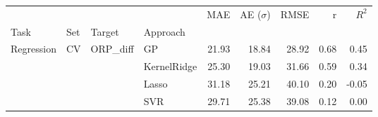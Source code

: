 \documentclass{standalone}
\begin{document}
\begin{tabular}{llllrrrrr}
\toprule
           &    &          &     &   MAE &  AE ($\sigma$) &  RMSE &    r &  $R^2$ \\
Task & Set & Target & Approach &       &                &       &      &        \\
\midrule
\multirow{4}{*}{Regression} & \multirow{4}{*}{CV} & \multirow{4}{*}{ORP_diff} & GP & 21.93 &          18.84 & 28.92 & 0.68 &   0.45 \\
           &    &          & KernelRidge & 25.30 &          19.03 & 31.66 & 0.59 &   0.34 \\
           &    &          & Lasso & 31.18 &          25.21 & 40.10 & 0.20 &  -0.05 \\
           &    &          & SVR & 29.71 &          25.38 & 39.08 & 0.12 &   0.00 \\
\bottomrule
\end{tabular}
\end{document}
